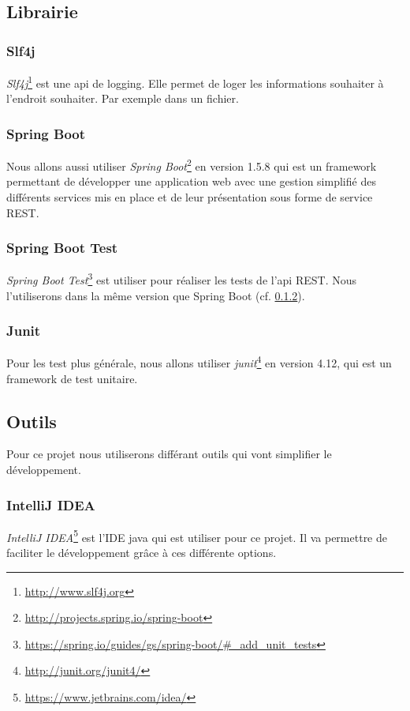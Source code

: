 \documentclass[12pt]{article}
\begin{document}
\subsection{Librairie}

\subsubsection{Slf4j}
\textit{Slf4j}\footnote{\url{http://www.slf4j.org}} est une api de logging. Elle permet de loger les informations souhaiter à l'endroit souhaiter. Par exemple dans un fichier.

\subsubsection{Spring Boot} \label{SpringBoot}
Nous allons aussi utiliser \textit{Spring Boot}\footnote{\url{http://projects.spring.io/spring-boot}} en version 1.5.8 qui est un framework permettant de développer une application web avec une gestion simplifié des différents services mis en place et de leur présentation sous forme de service REST.

\subsubsection{Spring Boot Test}
\textit{Spring Boot Test}\footnote{\url{https://spring.io/guides/gs/spring-boot/\#_add_unit_tests}} est utiliser pour réaliser les tests de l'api REST. Nous l'utiliserons dans la même version que Spring Boot (cf. \ref{SpringBoot}).

\subsubsection{Junit}
Pour les test plus générale, nous allons utiliser \textit{junit}\footnote{\url{http://junit.org/junit4/}} en version 4.12, qui est un framework de test unitaire.



\subsection{Outils}
Pour ce projet nous utiliserons différant outils qui vont simplifier le développement.


\subsubsection{IntelliJ IDEA}
\textit{IntelliJ IDEA}\footnote{\url{https://www.jetbrains.com/idea/}} est l'IDE java qui est utiliser pour ce projet. Il va permettre de faciliter le développement grâce à ces différente options.
\end{document}
